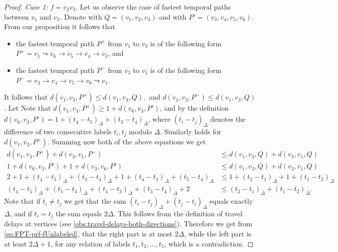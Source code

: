 \documentclass[a4paper,UKenglish,cleveref, autoref, thm-restate, anonymous]{lipics-v2021}
\begin{document}
\begin{proof}
    \emph{Case 1: }$f = v_2v_3$.
    Let us observe the case of fastest temporal paths between $v_{1}$ and $v_{3}$.
    Denote with $Q = (v_{1}, v_2, v_3)$ and with $P' = (v_3,v_4,v_5,v_6)$.
    From our proposition it follows that
    \begin{itemize}
        \item the fastest temporal path $P ^ +$ from $v_1$ to $v_3$ 
    is of the following form 
    $P^+ = v_{1}  \leadsto v_6 \rightarrow v_5 \rightarrow v_4 \rightarrow v_3$,
    and
        \item the fastest temporal path $P ^ -$ from $v_{3}$ to $v_{1}$ 
    is of the following form 
    $P^- = v_{3} \rightarrow v_{4} \rightarrow v_5 \rightarrow v_6 \leadsto v_1$.
    \end{itemize}
    It follows that 
    $
    d(v_{1}, v_{3}, P^+) \leq d(v_{1}, v_{3}, Q),
    $
    and
    $
    d(v_{1}, v_{3}, P^-) \leq d(v_{1}, v_{3}, Q)
    $.
    Let 
    Note that $d(v_{1}, v_{3}, P^+) \geq 1 + d(v_6,v_3,P')$,
    and by the definition $d(v_6,v_3,P') = 1 + (t_4 - t_5)_\Delta + (t_3 - t_4)_\Delta$,
    where $(t_i - t_j)_\Delta$ denotes the difference of two consecutive labels $t_i, t_j$ modulo $\Delta$.
    Similarly holds for $d(v_{1}, v_{3}, P^+)$.
    Summing now both of the above equations we get
    \begin{equation}
    \begin{split} \label{eq:FPT-prf-fUnlabeled}
        d(v_{1}, v_{3}, P^+) + d(v_{3}, v_{1}, P^-) &\leq 
        d(v_{1}, v_{3}, Q) + d(v_{3}, v_{1}, Q) \\
        1 + d(v_6,v_3,P') + 1 + d(v_3,v_6,P') &\leq d(v_{1}, v_{3}, Q) + d(v_{3}, v_{1}, Q) \\
        2 + 
        1 + (t_4 - t_5)_\Delta + (t_3 - t_4)_\Delta +
        1 + (t_4 - t_3)_\Delta + (t_5 - t_4)_\Delta 
        &\leq 
        1 + (t_2 - t_1)_\Delta + 
        1 + (t_1 - t_2)_\Delta\\
        (t_4 - t_5)_\Delta + (t_5 - t_4)_\Delta +
        (t_4 - t_3)_\Delta + (t_3 - t_4)_\Delta  + 2 
        &\leq 
        (t_2 - t_1)_\Delta + (t_1 - t_2)_\Delta.
    \end{split}
    \end{equation}
    Note that if $t_i \neq t_j$ we get that 
    the sum
    $(t_i - t_j)_\Delta + (t_j - t_i)_\Delta$ equals exactly $\Delta$,
    and if $t_i = t_j$ the sum equals $2\Delta$.
    This follows from the definition of travel delays at vertices (see \cref{obs:travel-delays-both-directions}).
    Therefore we get from \cref{eq:FPT-prf-fUnlabeled}, 
    that the right part is at most $2 \Delta$, while the left part is at least $2 \Delta + 1$,
    for any relation of labels $t_1,t_2, \dots, t_5$,
    which is a contradiction.


\end{proof}
\end{document}

